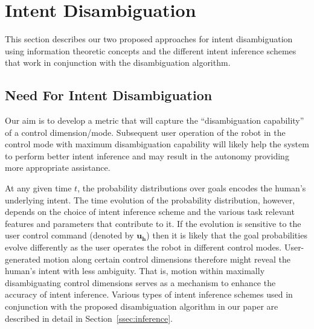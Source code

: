 \documentclass[conference]{IEEEtran}
\begin{document}
\section{Intent Disambiguation}\label{sec:disamb}

This section describes our two proposed approaches for intent disambiguation using information theoretic concepts and the different intent inference schemes that work in conjunction with the disambiguation algorithm. 

\subsection{Need For Intent Disambiguation}

Our aim is to develop a metric that will capture the ``disambiguation capability'' of a control dimension/mode. Subsequent user operation of the robot in the control mode with maximum disambiguation capability will likely help the system to perform better intent inference and may result in the autonomy providing more appropriate assistance.

At any given time $t$, the probability distributions over goals encodes the human's underlying intent. The time evolution of the probability distribution, however, depends on the choice of intent inference scheme and the various task relevant features and parameters that contribute to it. If the evolution is sensitive to the user control command (denoted by $\boldsymbol{u_h}$) then it is likely that the goal probabilities evolve differently as the user operates the robot in different control modes. User-generated motion along certain control dimensions therefore might reveal the human's intent with less ambiguity. That is, motion within maximally disambiguating control dimensions serves as a mechanism to enhance the accuracy of intent inference. Various types of intent inference schemes used in conjunction with the proposed disambiguation algorithm in our paper are described in detail in Section~\ref{ssec:inference}. 
\end{document}
